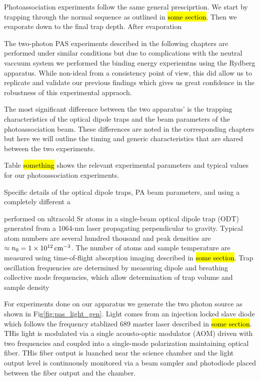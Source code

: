 Photoassociation experiments follow the same general presciprtion. We start by trapping through the normal sequence as outlined in \hl{some section}. Then we evaporate down to the final trap depth. After evaporation 

The two-photon PAS experiments described in the following chapters are performed under similar conditions but due to complications with the neutral vaccuum system we performed the binding energy experiemtns using the Rydberg apparatus. While non-ideal from a consistency point of view, this did allow us to replicate and validate our previous findings which gives us great confidence in the robustness of this experimental appraoch. 

The most significant difference between the two apparatus' is the trapping characteristics of the optical dipole traps and the beam parameters of the photoassociation beam. These differences are noted in the corresponding chapters but here we will outline the timing and generic characteristics that are shared between the two experiments. 

Table \hl{something} shows the relevant experimental parameters and typical values for our photoassociation experiments. 

Specific details of the optical dipole traps, PA beam parameters, and using a completely different a 

 performed on ultracold Sr atoms in a single-beam optical dipole trap (ODT) generated from a 1064-nm laser propagating perpendicular to gravity. Typical atom numbers are several hundred thousand and peak densities are $\approx n_0 = 1 \times 10^{12} \, \text{cm}^{-3}$. The number of atoms and sample temperature are measured using time-of-flight absorption imaging described in \hl{some section}. Trap oscillation frequencies are determined by measuring dipole and breathing collective mode frequencies, which allow determination of trap volume and sample density



For experiments done on our apparatus we generate the two photon source as shown in Fig\ref{fig:pas_light_gen}. Light comes from an injection locked slave diode which follows the frequency stablized 689 master laser described in \hl{some section}. THis light is modulated via a single acousto-optic modulator (AOM) driven with two frequencies and coupled into a single-mode polarization maintaining optical fiber. THis fiber output is luanched near the science chamber and the light output level is continuously monitored via a beam sampler and photodiode placed between the fiber output and the chamber.

